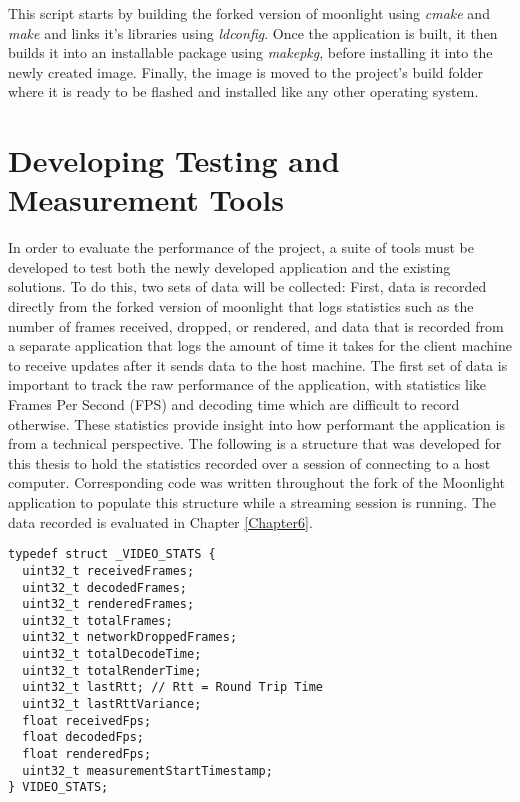 This script starts by building the forked version of moonlight using \emph{cmake} and \emph{make} and links it's libraries using \emph{ldconfig}.
Once the application is built, it then builds it into an installable package using \emph{makepkg}, before installing it into the newly created image.
Finally, the image is moved to the project's build folder where it is ready to be flashed and installed like any other operating system.


\section{Developing Testing and Measurement Tools}\label{sec:DevelopingTestingAndMeasurementTools}

In order to evaluate the performance of the project, a suite of tools must be developed to test both the newly developed application and the existing solutions.
To do this, two sets of data will be collected: First, data is recorded directly from the forked version of moonlight that logs statistics such as the number of frames received, dropped, or rendered, and data that is recorded from a separate application that logs the amount of time it takes for the client machine to receive updates after it sends data to the host machine.
The first set of data is important to track the raw performance of the application, with statistics like Frames Per Second (FPS) and decoding time which are difficult to record otherwise.
These statistics provide insight into how performant the application is from a technical perspective.
The following is a structure that was developed for this thesis to hold the statistics recorded over a session of connecting to a host computer.
Corresponding code was written throughout the fork of the Moonlight application to populate this structure while a streaming session is running.
The data recorded is evaluated in Chapter \ref{Chapter6}.

\begin{lstlisting}[style=customc,firstnumber=23,title=Excerpt from \emph{moonlight/src/video/stats.h}]
typedef struct _VIDEO_STATS {
  uint32_t receivedFrames;
  uint32_t decodedFrames;
  uint32_t renderedFrames;
  uint32_t totalFrames;
  uint32_t networkDroppedFrames;
  uint32_t totalDecodeTime;
  uint32_t totalRenderTime;
  uint32_t lastRtt; // Rtt = Round Trip Time
  uint32_t lastRttVariance;
  float receivedFps;
  float decodedFps;
  float renderedFps;
  uint32_t measurementStartTimestamp;
} VIDEO_STATS;
\end{lstlisting}

